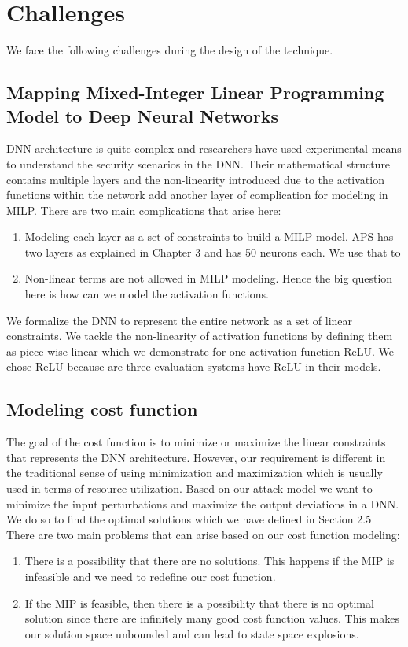 \chapter{Challenges}
We face  the following challenges during  the design of the technique. 

\section{ Mapping  Mixed-Integer Linear Programming Model to Deep Neural Networks}

DNN architecture is quite complex and researchers have used experimental means to understand the security scenarios in the DNN. 
Their  mathematical structure contains multiple layers and the non-linearity introduced due to the activation functions within the network add another layer of complication for modeling in \ac{MILP}.
There are two main complications that arise here:
\begin{enumerate}
	\item Modeling each layer as a set of constraints to build a \ac{MILP} model.
	\ac{APS} has two layers as explained in Chapter 3 and has 50 neurons each. 
	We use that to 
	\item Non-linear terms are not allowed in \ac{MILP} modeling. Hence the big question here is how can we model the activation functions. 
\end{enumerate}

We formalize the \ac{DNN} to represent the entire network as a set of linear constraints. 
We tackle the non-linearity of activation functions by defining them as piece-wise linear which we demonstrate for one activation function ReLU.
We chose ReLU because are three evaluation systems have ReLU in their models. 

\section{Modeling cost function}
The goal of the cost function is to minimize or maximize the linear constraints that represents the \ac{DNN} architecture. 
However, our requirement is different in the traditional sense of using minimization and maximization which is usually used in terms of resource utilization. 
Based on our attack model we want to minimize the input perturbations and maximize the output deviations in a \ac{DNN}.
We do so to find the optimal solutions which we have defined in Section 2.5
There are two main problems that can arise based on our cost function modeling:
\begin{enumerate}
	\item There is a possibility that there are no solutions. 
	This happens if the \ac{MIP} is infeasible and we need to redefine our cost function. 
	\item If the \ac{MIP} is feasible, then there is a possibility that there is no optimal solution since there are infinitely many good cost function values. 
	This makes our solution space unbounded and can lead to state space explosions. 
\end{enumerate}

